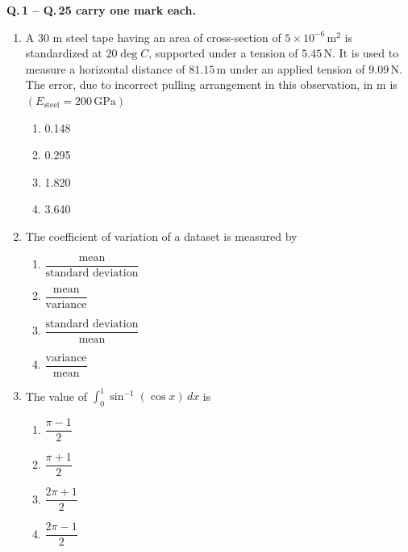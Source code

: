 \documentclass[journal]{IEEEtran}
\begin{document}
\noindent\textbf{Q.\,1 -- Q.\,25 carry one mark each.}\\[0.5em]
\begin{enumerate}[leftmargin=0pt]

\item A 30 m steel tape having an area of cross-section of $5 \times 10^{-6}\,\text{m}^{2}$ is
standardized at $20\deg C$, supported under a tension of $5.45\,\text{N}$. It is used to measure a
horizontal distance of $81.15\,\text{m}$ under an applied tension of $9.09\,\text{N}$. The error,
due to incorrect pulling arrangement in this observation, in m is \\
$(E_{\text{steel}} = 200\,\text{GPa})$
\begin{multicols}{2}
\begin{enumerate}[label=(\Alph*), itemsep=0pt, topsep=2pt]
  \item 0.148
  \item 0.295
  \item 1.820
  \item 3.640
\end{enumerate}
\end{multicols}
\hfill{}

\item The coefficient of variation of a dataset is measured by
\begin{multicols}{2}
\begin{enumerate}[label=(\Alph*), itemsep=0pt, topsep=2pt]
  \item $\dfrac{\text{mean}}{\text{standard deviation}}$\\[0.5em]
  \item $\dfrac{\text{mean}}{\text{variance}}$
  \item $\dfrac{\text{standard deviation}}{\text{mean}}$\\[0.5em]
  \item $\dfrac{\text{variance}}{\text{mean}}$
\end{enumerate}
\end{multicols}
\hfill{}

\item The value of $\displaystyle \int_{0}^{1}\sin^{-1}(\cos x)\,dx$ is
\begin{multicols}{2}
\begin{enumerate}[label=(\Alph*), itemsep=0pt, topsep=2pt]
  \item $\dfrac{\pi-1}{2}$
  \item $\dfrac{\pi+1}{2}$
  \item $\dfrac{2\pi+1}{2}$
  \item $\dfrac{2\pi-1}{2}$
\end{enumerate}
\end{multicols}
\hfill{}


\end{enumerate}
\end{document}
